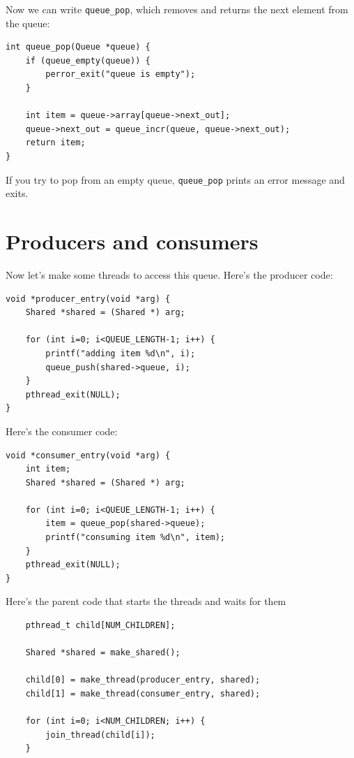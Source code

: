 \documentclass[12pt]{book}
\begin{document}
{Now we can write \verb"queue_pop", which removes and returns the next
element from the queue:

\begin{verbatim}
int queue_pop(Queue *queue) {
    if (queue_empty(queue)) {
        perror_exit("queue is empty");
    }
  
    int item = queue->array[queue->next_out];
    queue->next_out = queue_incr(queue, queue->next_out);
    return item;
}
\end{verbatim}

If you try to pop from an empty queue, \verb"queue_pop" prints
an error message and exits.


\section{Producers and consumers}
\label{prodcon}

Now let's make some threads to access this queue.  Here's the
producer code:

\begin{verbatim}
void *producer_entry(void *arg) {
    Shared *shared = (Shared *) arg;

    for (int i=0; i<QUEUE_LENGTH-1; i++) {
        printf("adding item %d\n", i);
        queue_push(shared->queue, i);
    }
    pthread_exit(NULL);
}
\end{verbatim}

Here's the consumer code:

\begin{verbatim}
void *consumer_entry(void *arg) {
    int item;
    Shared *shared = (Shared *) arg;

    for (int i=0; i<QUEUE_LENGTH-1; i++) {
        item = queue_pop(shared->queue);
        printf("consuming item %d\n", item);
    }
    pthread_exit(NULL);
}
\end{verbatim}

Here's the parent code that starts the threads and waits for them

\begin{verbatim}
    pthread_t child[NUM_CHILDREN];

    Shared *shared = make_shared();

    child[0] = make_thread(producer_entry, shared);
    child[1] = make_thread(consumer_entry, shared);

    for (int i=0; i<NUM_CHILDREN; i++) {
        join_thread(child[i]);
    }
\end{verbatim}

}
\end{document}
